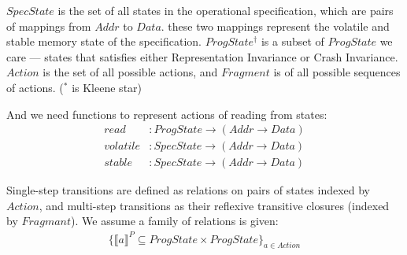 \documentclass[letterpaper,twocolumn,10pt]{article}
\theoremstyle{definition}
\begin{document}
$\mathit{SpecState}$ is the set of all states in the operational specification, which are pairs of mappings from $Addr$ to $Data$. these two mappings represent the volatile and stable memory state of the specification. $ProgState^\dagger$ is a subset of $ProgState$ we care \---- states that satisfies either Representation Invariance or Crash Invariance. $Action$ is the set of all possible actions, and $\mathit{Fragment}$ is of all possible sequences of actions. ($^*$ is Kleene star)

And we need functions to represent actions of reading from states:
\begin{align*}
	read &: \mathit{ProgState} \to (\mathit{Addr} \to \mathit{Data})\\
	volatile &: \mathit{SpecState} \to (\mathit{Addr} \to \mathit{Data})\\
	stable &: \mathit{SpecState} \to (\mathit{Addr} \to \mathit{Data})
\end{align*}

\newpage

Single-step transitions are defined as relations on pairs of states indexed by $\mathit{Action}$, and multi-step transitions as their reflexive transitive closures (indexed by $\mathit{Fragmant}$). We assume a family of relations is given:
\begin{align*}
	\{ \llbracket a \rrbracket^P \subseteq \mathit{ProgState \times ProgState} \}_\mathit{a \in Action}
\end{align*}
\end{document}
